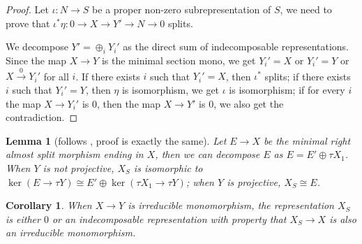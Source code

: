 \documentclass[reqno,11pt]{amsart}
\numberwithin{equation}{section}
\theoremstyle{plain}
\newtheorem{lemma}[theorem]{Lemma}
\newtheorem{corollary}[theorem]{Corollary}
\theoremstyle{plain}
\numberwithin{equation}{section}
\theoremstyle{remark}
\begin{document}
\begin{proof}
	Let $\iota:N \longrightarrow S$ be a proper non-zero subrepresentation of $S$, we need to prove that $\iota^* \eta: 0\longrightarrow X \longrightarrow Y' \longrightarrow N \longrightarrow 0$ splits.
	

\begin{center}
\end{center}
	
	We decompose $Y'=\oplus_i Y_i'$ as the direct sum of indecomposable representations. Since the map $X\longrightarrow Y$ is the minimal section mono, we get $Y_i'=X$ or $Y_i'=Y$ or $X\stackrel{0}{\longrightarrow} Y_i'$ for all $i$.
	If there exists $i$ such that $Y_i'=X$, then $\iota^* $ splits; if there exists $i$ such that $Y_i'=Y$, then $\eta$ is isomorphism, we get $\iota$ is isomorphism; if for every $i$ the map $X \longrightarrow Y_i'$ is $0$, then the map $X \longrightarrow Y'$ is $0$, we also get the contradiction.
\end{proof}
\begin{lemma}[{follows \cite[Lemma 36]{irelli2019cell}, proof is exactly the same}]\label{lem:descriptionofX_S}
	Let $E \longrightarrow X$ be the minimal right almost split morphism ending in $X$, then we can decompose $E$ as $E=E' \oplus \tau X_1$. When $Y$ is not projective, $X_S$ is isomorphic to $\ker (E \longrightarrow \tau Y) \cong E' \oplus \ker (\tau X_1 \longrightarrow \tau Y)$; when $Y$ is projective, $X_S \cong E$.
\end{lemma}
\begin{corollary}
	When $X \longrightarrow Y$ is irreducible monomorphism, the representation $X_S$ is either $0$ or an indecomposable representation with property that $X_S \longrightarrow X$ is also an irreducible monomorphism.
\end{corollary}
\end{document}
